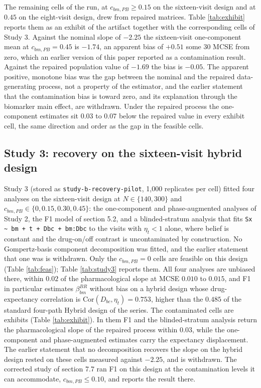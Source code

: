 \documentclass[
  11pt,
]{article}
\begin{document}
The remaining cells of the run, at \(c_{bm,PB} \ge 0.15\) on the
sixteen-visit design and at \(0.45\) on the eight-visit design, drew from
repaired matrices. Table \ref{tab:exhibit} reports them as an exhibit of
the artifact together with the corresponding cells of Study 3. Against the
nominal slope of \(-2.25\) the sixteen-visit one-component mean at
\(c_{bm,PB} = 0.45\) is \(-1.74\),
an apparent bias of \(+0.51\) some 30
MCSE from zero, which an earlier version of this paper reported as a
contamination result. Against the repaired population value of
\(-1.69\) the bias is
\(-0.05\).
The apparent positive, monotone bias was the gap between the nominal and
the repaired data-generating process, not a property of the estimator,
and the earlier statement that the contamination bias is toward zero, and
its explanation through the biomarker main effect, are withdrawn. Under
the repaired process the one-component estimates sit \(0.03\) to \(0.07\)
below the repaired value in every exhibit cell, the same direction and
order as the gap in the feasible cells.

\subsection{Study 3: recovery on the sixteen-visit hybrid design}\label{study-3-recovery-on-the-sixteen-visit-hybrid-design}

Study 3 (stored as \texttt{study-b-recovery-pilot}, 1,000 replicates per
cell) fitted four analyses on the sixteen-visit design at \(N \in
\{140, 300\}\) and \(c_{bm,PB} \in \{0, 0.15, 0.30, 0.45\}\): the
one-component and phase-augmented analyses of Study 2, the F1 model of
section 5.2, and a blinded-stratum analysis that fits
\texttt{Sx \textasciitilde{} bm + t + Dbc + bm:Dbc} to the visits with
\(\eta_t < 1\) alone, where belief is constant and the drug-on/off contrast
is uncontaminated by construction. No Gompertz-basis component
decomposition was fitted, and the earlier statement that one was is
withdrawn. Only the \(c_{bm,PB} = 0\) cells are feasible on this design
(Table \ref{tab:feas}); Table \ref{tab:study3} reports them. All four
analyses are unbiased there, within \(0.02\) of the pharmacological slope at
MCSE \(0.010\) to \(0.015\), and F1 in particular estimates \(\beta_{bm}^{BR}\)
without bias on a hybrid design whose drug-expectancy correlation is
\(\mathrm{Cor}(D_{bc}, \eta_t) = 0.753\), higher than the \(0.485\) of the
standard four-path Hybrid design of the series. The contaminated cells
are exhibits (Table \ref{tab:exhibit}). In them F1 and the
blinded-stratum analysis return the pharmacological slope of the repaired
process within \(0.03\), while the one-component and phase-augmented
estimates carry the expectancy displacement. The earlier statement
that no decomposition recovers the slope on the hybrid design rested on
these cells measured against \(-2.25\), and is withdrawn. The corrected study of section 7.7 ran F1 on this design at
the contamination levels it can accommodate, \(c_{bm,PB} \le 0.10\), and
reports the result there.
\end{document}
